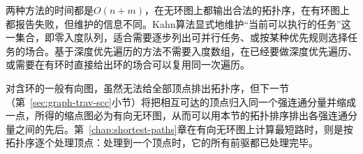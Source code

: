 两种方法的时间都是$O(n+m)$，在无环图上都输出合法的拓扑序，在有环图上都报告失败，但维护的信息不同。Kahn算法显式地维护“当前可以执行的任务”这一集合，即零入度队列，适合需要逐步列出可并行任务、或按某种优先规则选择任务的场合。基于深度优先遍历的方法不需要入度数组，在已经要做深度优先遍历、或需要在有环时直接给出环的场合可以复用同一次遍历。

对含环的一般有向图，虽然无法给全部顶点排出拓扑序，但下一节（第~\ref{sec:graph-trav-scc}小节）将把相互可达的顶点归入同一个强连通分量并缩成一点，所得的缩点图必为有向无环图，从而可以用本节的拓扑排序排出各强连通分量之间的先后。第~\ref{chap:shortest-paths}章在有向无环图上计算最短路时，则是按拓扑序逐个处理顶点：处理到一个顶点时，它的所有前驱都已处理完毕。
